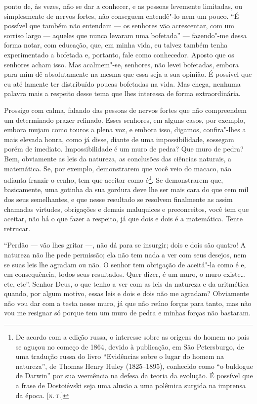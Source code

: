 ponto de, às vezes, não se dar a conhecer, e as pessoas levemente
limitadas, ou simplesmente de nervos fortes, não conseguem entendê"-lo
nem um pouco. ``É possível que também não entendam --- os senhores vão
acrescentar, com um sorriso largo --- aqueles que nunca levaram uma
bofetada'' --- fazendo"-me dessa forma notar, com educação, que, em minha
vida, eu talvez também tenha experimentado a bofetada e, portanto, fale
como conhecedor. Aposto que os senhores acham isso. Mas acalmem"-se,
senhores, não levei bofetadas, embora para mim dê absolutamente na mesma
que essa seja a sua opinião. É possível que eu até lamente ter
distribuído poucas bofetadas na vida. Mas chega, nenhuma palavra mais a
respeito desse tema que lhes interessa de forma extraordinária.

Prossigo com calma, falando das pessoas de nervos fortes que não
compreendem um determinado prazer refinado. Esses senhores, em alguns
casos, por exemplo, embora mujam como touros a plena voz, e embora isso,
digamos, confira"-lhes a mais elevada honra, como já disse, diante de uma
impossibilidade, sossegam porém de imediato. Impossibilidade é um muro
de pedra? Que muro de pedra? Bem, obviamente as leis da natureza, as
conclusões das ciências naturais, a matemática. Se, por exemplo,
demonstrarem que você veio do macaco, não adianta franzir o cenho, tem
que aceitar como é\footnote{De acordo com a edição russa, o interesse
  sobre as origens do homem no país se aguçou no começo de 1864, devido
  à publicação, em São Petersburgo, de uma tradução russa do livro
  ``Evidências sobre o lugar do homem na natureza'', de Thomas Henry
  Huley (1825--1895), conhecido como ``o buldogue de Darwin'' por sua
  veemência na defesa da teoria da evolução. É possível que a frase de
  Dostoiévski seja uma alusão a uma polêmica surgida na imprensa da
  época. {[}\textsc{n.\,t.}{]}}. Se demonstrarem que, basicamente, uma gotinha da
sua gordura deve lhe ser mais cara do que cem mil dos seus semelhantes,
e que nesse resultado se resolvem finalmente as assim chamadas virtudes,
obrigações e demais maluquices e preconceitos, você tem que aceitar, não
há o que fazer a respeito, já que dois e dois é a matemática. Tente
retrucar.

``Perdão --- vão lhes gritar ---, não dá para se insurgir; dois e dois são
quatro! A natureza não lhe pede permissão; ela não tem nada a ver com
seus desejos, nem se suas leis lhe agradam ou não. O senhor tem
obrigação de aceitá"-la como é e, em consequência, todos seus resultados.
Quer dizer, é um muro, o muro existe\ldots{} etc, etc''. Senhor Deus, o que
tenho a ver com as leis da natureza e da aritmética quando, por algum
motivo, essas leis e dois e dois não me agradam? Obviamente não vou dar
com a testa nesse muro, já que não reúno forças para tanto, mas não vou
me resignar só porque tem um muro de pedra e minhas forças não bastaram.

